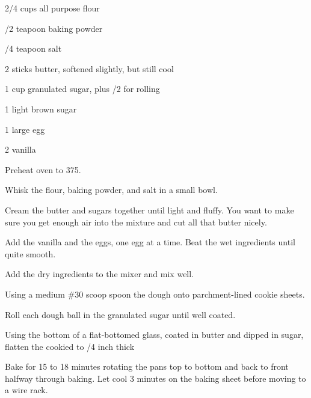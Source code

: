 %
%
%
%
\newpage



\begin{IngredientsAndSteps}
    \ListIngredientsAndSteps
    {
        2/4 cups all purpose flour

        /2 teapoon baking powder

        /4 teapoon salt

        \IngredientsSeparatorClear

        2 sticks butter, softened slightly, but still cool

        1 cup granulated sugar, plus /2 for rolling

        1 \Tbl light brown sugar

        \IngredientsSeparatorClear

        1 large egg

        2 \tsp[s] vanilla
    }
    {
        Preheat oven to 375\Degrees[F].

        Whisk the flour, baking powder, and salt in a small bowl.

        Cream the butter and sugars together until light and fluffy. You want to make sure you get
        enough air into the mixture and cut all that butter nicely.

        Add the vanilla and the eggs, one egg at a time. Beat the wet ingredients until quite smooth.

        Add the dry ingredients to the mixer and mix well.

        Using a medium \#30 scoop spoon the dough onto parchment-lined cookie sheets.

        Roll each dough ball in the granulated sugar until well coated.

        Using the bottom of a flat-bottomed glass, coated in butter and dipped in sugar,
        flatten the cookied to /4 inch thick

        Bake for 15 to 18 minutes rotating the pans top to bottom and back to front halfway
        through baking. Let cool 3 minutes on the baking sheet before moving to a wire rack.
    }
\end{IngredientsAndSteps}

